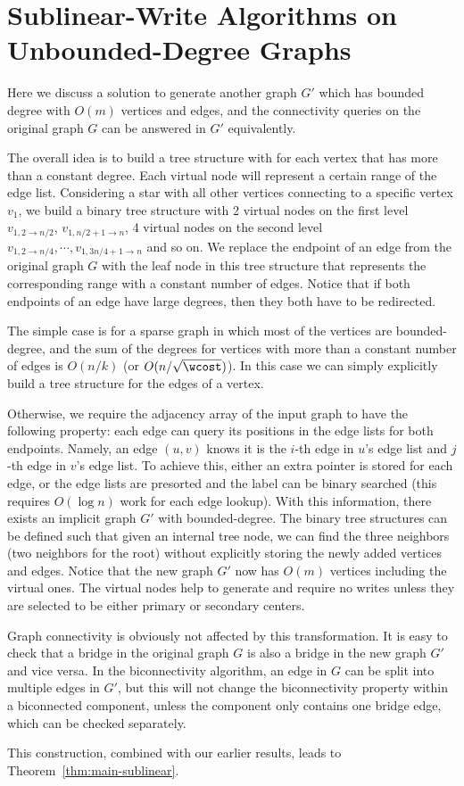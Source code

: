 \section{Sublinear-Write Algorithms on Unbounded-Degree Graphs}\label{sec:appendix-unbounded}

Here we discuss a solution to generate another graph $G'$ which has bounded degree with $O(m)$ vertices and edges, and the connectivity queries on the original graph $G$ can be answered in $G'$ equivalently.

The overall idea is to build a tree structure with  for each vertex that has more than a constant degree.
Each virtual node will represent a certain range of the edge list.
Considering a star with all other vertices connecting to a specific vertex $v_1$, we build a binary tree structure with 2 virtual nodes on the first level $v_{1,2\to n/2}$, $v_{1,n/2+1\to n}$, 4 virtual nodes on the second level $v_{1,2\to n/4},\cdots,v_{1,3n/4+1\to n}$ and so on.
We replace the endpoint of an edge from the original graph $G$ with the leaf node in this tree structure that represents the corresponding range with a constant number of edges.
Notice that if both endpoints of an edge have large degrees, then they both have to be redirected.

The simple case is for a sparse graph in which most of the vertices are bounded-degree, and the sum of the degrees for vertices with more than a constant number of edges is $O(n/k)$ (or $O(n/\sqrt{\wcost})$).
In this case we can simply explicitly build a tree structure for the edges of a vertex.

Otherwise, we require the adjacency array of the input graph to have the following property: each edge can query its positions in the edge lists for both endpoints.
Namely, an edge $(u,v)$ knows it is the $i$-th edge in $u$'s edge list and $j$-th edge in $v$'s edge list.
To achieve this, either an extra pointer is stored for each edge, or the edge lists are presorted and the label can be binary searched (this requires $O(\log n)$ work for each edge lookup).
With this information, there exists an implicit graph $G'$ with bounded-degree.
The binary tree structures can be defined such that given an internal tree node, we can find the three neighbors (two neighbors for the root) without explicitly storing the newly added vertices and edges.
Notice that the new graph $G'$ now has $O(m)$ vertices including the virtual ones.
The virtual nodes help to generate \implicit{} and require no writes unless they are selected to be either primary or secondary centers.

Graph connectivity is obviously not affected by this transformation.
It is easy to check that a bridge in the original graph $G$ is also a bridge in the new graph $G'$ and vice versa.
In the biconnectivity algorithm, an edge in $G$ can be split into multiple edges in $G'$, but this will not change the biconnectivity property within a biconnected component, unless the component only contains one bridge edge, which can be checked separately.

This construction, combined with our earlier results, leads to
Theorem~\ref{thm:main-sublinear}.
